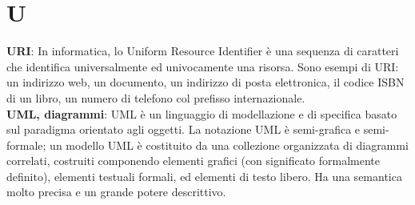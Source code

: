 \section{U}
\textbf{URI}: In informatica, lo Uniform Resource Identifier è una sequenza di caratteri che identifica universalmente ed univocamente una risorsa. Sono esempi di URI: un indirizzo web, un documento, un indirizzo di posta elettronica, il codice ISBN di un libro, un numero di telefono col prefisso internazionale.\\
\textbf{UML, diagrammi}: UML è un linguaggio di modellazione e di specifica basato sul paradigma orientato agli oggetti.
 La notazione UML è semi-grafica e semi-formale; un modello UML è costituito da una collezione organizzata di diagrammi correlati, costruiti componendo elementi grafici (con significato
formalmente definito), elementi testuali formali, ed elementi di testo libero. Ha una semantica molto
precisa e un grande potere descrittivo.\\